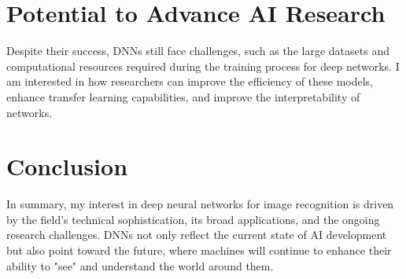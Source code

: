 \documentclass[a4paper,journal]{IEEEtran}
\begin{document}
\section{Potential to Advance AI Research}
Despite their success, DNNs still face challenges, such as the large datasets and computational resources required during the training process for deep networks. I am interested in how researchers can improve the efficiency of these models, enhance transfer learning capabilities, and improve the interpretability of networks.

\section{Conclusion}
In summary, my interest in deep neural networks for image recognition is driven by the field’s technical sophistication, its broad applications, and the ongoing research challenges. DNNs not only reflect the current state of AI development but also point toward the future, where machines will continue to enhance their ability to "see" and understand the world around them.
\end{document}
